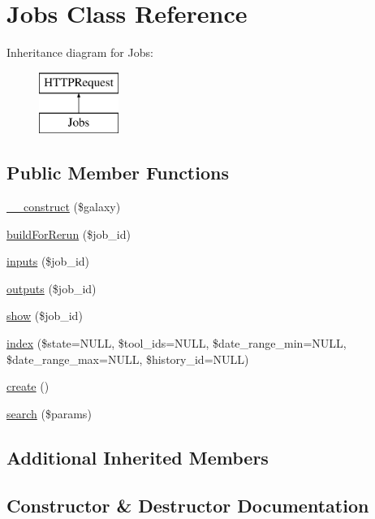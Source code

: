 \hypertarget{classJobs}{}\section{Jobs Class Reference}
\label{classJobs}
Inheritance diagram for Jobs\+:\begin{figure}[H]
\begin{center}
\leavevmode
\includegraphics[height=2.000000cm]{classJobs}
\end{center}
\end{figure}
\subsection*{Public Member Functions}
\begin{DoxyCompactItemize}
\item 
\hyperlink{classJobs_ad7a85851751aa89c92294c55aa9fcc87}{\+\_\+\+\_\+construct} (\$galaxy)
\item 
\hyperlink{classJobs_abadc1a5ebccaeb6b5b977328609f5a34}{build\+For\+Rerun} (\$job\+\_\+id)
\item 
\hyperlink{classJobs_a4859adf323104d74772c2d9cbcb04331}{inputs} (\$job\+\_\+id)
\item 
\hyperlink{classJobs_a6fa75d976f7dcbe31cb1191effa0a9ea}{outputs} (\$job\+\_\+id)
\item 
\hyperlink{classJobs_af95758c7cad6b00529344f0ddeb1e830}{show} (\$job\+\_\+id)
\item 
\hyperlink{classJobs_a428dddc2ccac56c7e3c83f524d9f719c}{index} (\$state=N\+U\+LL, \$tool\+\_\+ids=N\+U\+LL, \$date\+\_\+range\+\_\+min=N\+U\+LL, \$date\+\_\+range\+\_\+max=N\+U\+LL, \$history\+\_\+id=N\+U\+LL)
\item 
\hyperlink{classJobs_a4707d2d193d37086cbac02f9c7463eab}{create} ()
\item 
\hyperlink{classJobs_a0f7e6dedeee443ad8c262ee4d55df136}{search} (\$params)
\end{DoxyCompactItemize}
\subsection*{Additional Inherited Members}


\subsection{Constructor \& Destructor Documentation}
